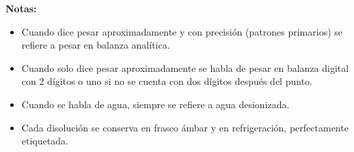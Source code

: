 \textbf{Notas:}
\begin{itemize}
    \item Cuando dice pesar aproximadamente y con precisión (patrones primarios) se refiere a pesar en balanza analítica.
    \item Cuando solo dice pesar aproximadamente se habla de pesar en balanza digital con 2 dígitos o uno si no se cuenta con dos dígitos después del punto.
    \item Cuando se habla de agua, siempre se refiere a agua desionizada.
    \item Cada disolución se conserva en frasco ámbar y en refrigeración, perfectamente etiquetada.
\end{itemize}

